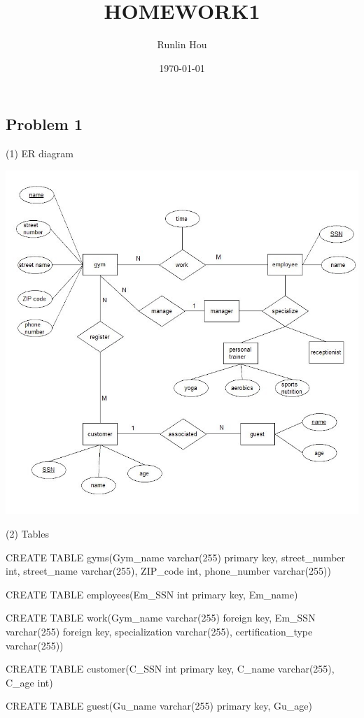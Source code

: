 \documentclass{article}
\title{HOMEWORK1}
\author{Runlin Hou}
\date{\today}
\begin{document}
    \maketitle
    \subsection*{Problem 1}

    (1) ER diagram
    \begin{center}
        \includegraphics[scale=0.5]{1_2bk.jpg}
    \end{center}
    
    (2) Tables

    CREATE TABLE gyms(Gym\_name varchar(255) primary key, street\_number int, street\_name varchar(255), ZIP\_code int, phone\_number varchar(255))

    CREATE TABLE employees(Em\_SSN int primary key, Em\_name)

    CREATE TABLE work(Gym\_name varchar(255) foreign key, Em\_SSN varchar(255) foreign key, specialization varchar(255), certification\_type varchar(255))
    
    CREATE TABLE customer(C\_SSN int primary key, C\_name varchar(255), C\_age int)

    CREATE TABLE guest(Gu\_name varchar(255) primary key, Gu\_age)
\end{document}
